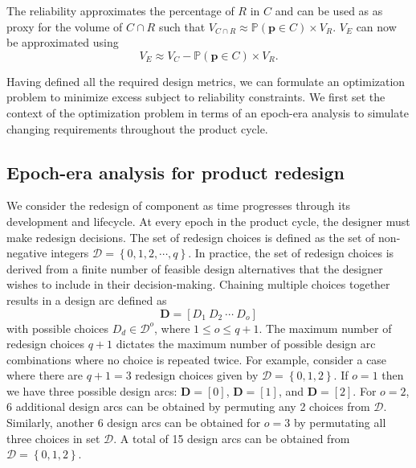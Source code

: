 The reliability approximates the percentage of $R$ in $C$ and can be used as as proxy for the volume of $C\cap R$ such that $V_{C\cap R} \approx \mathbb{P}(\mathbf{p} \in C) \times V_R$. $V_E$ can now be approximated using
%
\begin{equation} \label{eq:excesssimple}
	V_E \approx V_C - \mathbb{P}(\mathbf{p} \in C) \times V_R.
\end{equation}

Having defined all the required design metrics, we can formulate an optimization problem to minimize excess subject to reliability constraints. We first set the context of the optimization problem in terms of an epoch-era analysis \cite{Ross2008} to simulate changing requirements throughout the product cycle.

\subsection{Epoch-era analysis for product redesign} \label{subsec:epochera}

We consider the redesign of component as time progresses through its development and lifecycle. At every epoch in the product cycle, the designer must make redesign decisions. The set of redesign choices is defined as the set of non-negative integers $\mathcal{D} = \left\{0,1,2,\cdots,q\right\}$. {\color{red} In practice, the set of redesign choices is derived from a finite number of feasible design alternatives that the designer wishes to include in their decision-making.} Chaining multiple choices together results in a design arc defined as
%
\begin{equation} \label{eq:designarc}
	\mathbf{D} = \left[D_1 ~ D_2 ~ \cdots ~ D_o\right]%
\end{equation}
%
with possible choices $D_d \in \mathcal{D}^o$, where $1 \leq o \leq q+1$. The maximum number of redesign choices $q + 1$ dictates the maximum number of possible design arc combinations where no choice is repeated twice. For example, consider a case where there are $q + 1 = 3$ redesign choices given by $\mathcal{D} = \left\{0,1,2\right\}$. If $o=1$ then we have three possible design arcs: $\mathbf{D} = \left[0\right]$, $\mathbf{D} = \left[1\right]$, and $\mathbf{D} = \left[2\right]$. For $o=2$, 6 additional design arcs can be obtained by permuting any 2 choices from $\mathcal{D}$. Similarly, another 6 design arcs can be obtained for $o=3$ by permutating all three choices in set $\mathcal{D}$. A total of 15 design arcs can be obtained from $\mathcal{D} = \left\{0,1,2\right\}$.

